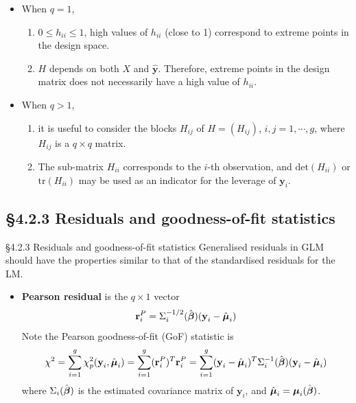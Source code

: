 \documentclass{beamer}
\newcommand{\currentsubsection}{}
\let\oldsubsection\subsection
\renewcommand{\subsection}[1]{\oldsubsection{#1}\renewcommand{\currentsubsection}{#1}}
\begin{document}
\begin{frame}{}
\begin{itemize}
\item
When  $q=1$,
\begin{enumerate}
\item
$0\leq h_{ii}\leq 1$, high values of $h_{ii}$ (close to 1) correspond to extreme points in the design space.
\item
$H$ depends on both $X$ and $\hat{\textbf{y}}$. Therefore, extreme points in the design matrix does not
necessarily have a high value of $h_{ii}$.
\end{enumerate}
\item 
When $q>1$,
\begin{enumerate}
\item
it is useful to consider the blocks $H_{ij}$ of $H=(H_{ij})$, $i,j=1,\cdots,g$, where
$H_{ij}$ is a $q\times q$ matrix.
\item
The sub-matrix $H_{ii}$ corresponds to the $i$-th observation, and $\mbox{det}(H_{ii})$ or
$\mbox{tr}(H_{ii})$ may be used as an indicator for the leverage of $\textbf{y}_i$.
\end{enumerate}
\end{itemize}
\end{frame}

\subsection{\S4.2.3 Residuals and goodness-of-fit statistics}
\begin{frame}{\S4.2.3 Residuals and goodness-of-fit statistics}
Generalised residuals in GLM should have the properties similar to that of the standardised residuals for the LM.
\begin{itemize}
\item
\textbf{Pearson residual} is the $q\times 1$ vector
$$\textbf{r}_i^P=\Sigma_i^{-1/2}(\hat{\mbox{\boldmath $\beta$}})(\textbf{y}_i-\hat{\mbox{\boldmath $\mu$}}_i)$$
Note the Pearson goodness-of-fit (GoF) statistic is
$$\chi^2=\sum_{i=1}^g \chi_p^2(\textbf{y}_i,\hat{\mbox{\boldmath $\mu$}}_i)=\sum_{i=1}^g
(\textbf{r}_i^P)^T\textbf{r}_i^P=\sum_{i=1}^g (\textbf{y}_i-\hat{\mbox{\boldmath $\mu$}}_i)^T
\Sigma_i^{-1}(\hat{\mbox{\boldmath $\beta$}})(\textbf{y}_i-\hat{\mbox{\boldmath $\mu$}}_i)$$
where $\Sigma_i (\hat{\mbox{\boldmath $\beta$}})$ is the estimated covariance matrix of $\textbf{y}_i$,
and $\hat{\mbox{\boldmath $\mu$}}_i=\mbox{\boldmath $\mu$}_i(\hat{\mbox{\boldmath $\beta$}})$.
\end{itemize}
\end{frame}
\end{document}

